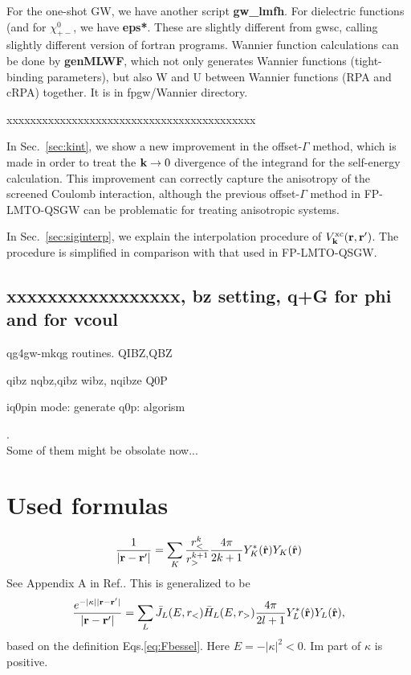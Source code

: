 \documentclass[a4paper,10pt,epsf,fleqn]{article}
\def\vxc{V^{\rm xc}}
\newcommand{\bfk}{{\bf k}}
\newcommand{\bfr}{{\bf r}}
\newcommand{\exe}[1]{{\bf #1}}
\newcommand{\io}[1]{{\sf  #1}}
\begin{document}
For the one-shot GW, we have another script \exe{gw\_lmfh}.
For dielectric functions (and for $\chi_{+-}^0$, we have \exe{eps*}.
These are slightly different from gwsc, calling
slightly different version of fortran programs.
Wannier function calculations can be done by \exe{genMLWF},
which not only generates Wannier functions (tight-binding parameters), 
but also W and U between Wannier functions (RPA and cRPA) together. 
It is in \io{fpgw/Wannier} directory.


xxxxxxxxxxxxxxxxxxxxxxxxxxxxxxxxxxxxxxxxxx


In Sec.~\ref{sec:kint}, we show a new improvement in the offset-$\Gamma$ method, which is
made in order to treat the $\bfk \to 0$ divergence of the integrand for the self-energy calculation.
This improvement can correctly capture the anisotropy of the screened Coulomb interaction,
although the previous offset-$\Gamma$ method in FP-LMTO-QSGW \cite{kotani_quasiparticle_2007}
can be problematic for treating anisotropic systems.

In Sec.~\ref{sec:siginterp}, we explain the interpolation procedure of 
$\vxc_\bfk(\bfr,\bfr')$. The procedure is simplified in comparison with that used in FP-LMTO-QSGW.






\subsection{xxxxxxxxxxxxxxxxx, bz setting, q+G for phi and for vcoul}
qg4gw-mkqg routines.
QIBZ,QBZ 

qibz nqbz,qibz wibz, 
nqibze Q0P

iq0pin mode:
generate q0p: algorism


\newpage
\appendix
{}.  \\Some of them might be obsolate now...

\section{Used formulas}
\label{usedf}

\begin{eqnarray}
\frac{1}{|\bfr-\bfr'|}=\sum_K \frac{r^k_<}{r^{k+1}_>}\frac{4\pi}{2k+1}
Y^*_K(\hat{\bfr})Y_K(\hat{\bfr}) \label{eq:oneorr}
\end{eqnarray}
See Appendix A in Ref.\cite{svane_evaluation_1986}.
This is generalized to be
\begin{eqnarray}
\frac{e^{-|\kappa| |\bfr-\bfr'|}}{|\bfr-\bfr'|}=\sum_L 
\bar{J}_L(E,r_<) \bar{H}_L(E,r_>) \frac{4\pi}{2l+1}
Y^*_L(\hat{\bfr})Y_L(\hat{\bfr}), \label{eq:oneorr2}
\end{eqnarray}
based on the definition Eqs.\ref{eq:Fbessel}.
Here $E=-|\kappa|^2 <0$. Im part of $\kappa$ is positive.
\end{document}
